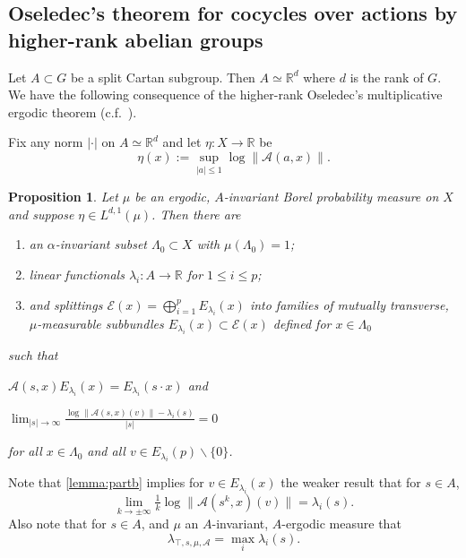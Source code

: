 \documentclass[10pt,reqno]{amsart}
\theoremstyle{Theorem}
\newtheorem{proposition}[theorem]{Proposition}
\theoremstyle{definition}
\theoremstyle{remark}
\newcommand{\sm}{\smallsetminus}
\newcommand{\R}{\mathbb {R}}
\newcommand{\N}{\mathbb {N}}
\def\calA{\mathcal A}
\def\calE{\mathcal E}
\begin{document}

\subsection{Oseledec's theorem for cocycles over actions by higher-rank abelian groups}
Let $A\subset G$ be a split Cartan subgroup.  Then $A\simeq \R^d$ where $d$ is the rank of $G$.
We have the following consequence of the higher-rank Oseledec's multiplicative ergodic theorem  (c.f.\ \cite[Theorem 2.4]{AWB-GLY-P1}).

Fix any norm $| \cdot |$ on $A\simeq \R^d$ and let $\eta\colon X\to \R$ be $$\eta(x) := \sup_{|a|\le 1} \log \| \calA(a, x)\|.$$
\begin{proposition}
\label{thm:higherrankMET}Let $\mu$ be an ergodic, $A$-invariant Borel probability measure on $X$ and
suppose $\eta\in L^{d,1}(\mu)$.  Then there are
	\begin{enumerate}
	\item an $\alpha$-invariant subset $\Lambda_0\subset X$ with $\mu(\Lambda_0)=1$;
  \item %
   linear functionals $\lambda_i\colon A \to \R$ for $1\le i\le p$;  %
	\item   and splittings   $\calE(x)= \bigoplus _{i=1}^p E_{\lambda_i}(x)$ %
	into families of mutually transverse,  $\mu$-measurable  subbundles $E_{\lambda_i}(x)\subset \calE(x)$ defined  for $x\in \Lambda_0$

	\end{enumerate}
such that
\begin{enumlemma}	
	\item $\calA (s, x) E_{\lambda_i}(x)= E_{\lambda_i}(s\cdot x)$ and
	\item \label{lemma:partb} $\displaystyle \lim_{|s|\to \infty} \frac { \log \|  \calA (s,x) (v)\| - \lambda_i(s)}{|s|}=0$
\end{enumlemma}	
	for all $x\in \Lambda_0$ and all $ v\in  E_{\lambda_i}(p)\sm \{0\}$.  %
 \end{proposition}
Note that \ref{lemma:partb} implies for $v\in E_{\lambda_i}(x)$ the weaker result that for $s\in A$,
$$\lim_{k\to\pm \infty} \tfrac {1} k \log \|  \calA (s^k,x) (v)\| =  \lambda_i(s).$$
Also note that for $s\in A$, and $\mu$ an $A$-invariant, $A$-ergodic measure that
\begin{equation}\label{eq:lameducksoup}\lambda_{\top, s, \mu,\calA} = \max _i \lambda_i(s).\end{equation}
\end{document}
